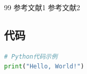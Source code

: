 \documentclass[withoutpreface]{cumcmthesis}
\begin{document}
\begin{thebibliography}{99}
 参考文献1
 参考文献2
\end{thebibliography}

\begin{appendices}
\section{代码}
\begin{lstlisting}[language=Python]
# Python代码示例
print("Hello, World!")
\end{lstlisting}
\end{appendices}
\end{document}
